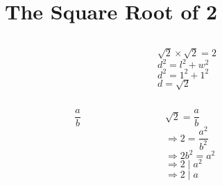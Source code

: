 \section{The Square Root of 2}

\begin{frame}
  \begin{columns}
    \begin{column}{0.3\textwidth}
      \centering
    \end{column}
    {\color{gmitgrey!30}\vrule{}} \hspace{0.1\textwidth}
    \begin{column}{0.5\textwidth}
      $\sqrt{2} \times \sqrt{2} = 2$ \\[16mm]
      $d^2 = l^2 + w^2$ \\[4mm]
      $d^2 = 1^2 + 1^2$ \\[4mm]
      $d = \sqrt{2}$ \\[8mm]
    \end{column}
  \end{columns}
\end{frame}


\begin{frame}
  \begin{columns}
    \begin{column}{0.3\textwidth}
      \color{gmitblue} \fontsize{30}{10}
      \[\frac{a}{b}\]
    \end{column}
    {\color{gmitgrey!30}\vrule{}} \hspace{0.1\textwidth}
    \begin{column}{0.5\textwidth}
      $\sqrt{2} = \dfrac{a}{b}$ \\[8mm]
      $\Rightarrow 2 = \dfrac{a^2}{b^2}$ \\[8mm]
      $\Rightarrow 2b^2 = a^2$ \\[8mm]
      $\Rightarrow 2 \mid a^2$ \\[8mm]
      $\Rightarrow 2 \mid a$
    \end{column}
  \end{columns}
\end{frame}


